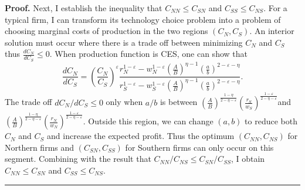 \documentclass[notitlepage,11pt]{article}%
\newenvironment{proof}[1][Proof]{\noindent \textbf{#1.} }{\  \rule{0.5em}{0.5em}}
\begin{document}
\begin{proof}
Next, I establish the inequality that $C_{NN}\leq C_{SN}$ and $C_{SS}\leq
C_{NS}$. For a typical firm, I can transform its technology choice problem
into a problem of choosing marginal costs of production in the two regions
$\left(  C_{N},C_{S}\right)  $. An interior solution must occur where there is
a trade off between minimizing $C_{N}$ and $C_{S}$ thus $\frac{dC_{N}}{dC_{S}%
}\leq0$. When production function is CES, one can show that
\[
\frac{dC_{N}}{dC_{S}}=\left(  \frac{C_{N}}{C_{S}}\right)  ^{\varepsilon}%
\frac{r_{N}^{1-\varepsilon}-w_{N}^{1-\varepsilon}\left(  \frac{A}{B}\right)
^{\eta-1}\left(  \frac{a}{b}\right)  ^{2-\varepsilon-\eta}}{r_{S}%
^{1-\varepsilon}-w_{S}^{1-\varepsilon}\left(  \frac{A}{B}\right)  ^{\eta
-1}\left(  \frac{a}{b}\right)  ^{2-\varepsilon-\eta}}.
\]
The trade off $dC_{N}/dC_{S}\leq0$ only when $a/b$ is between $\left(
\frac{A}{B}\right)  ^{\frac{1-\eta}{2-\eta-\varepsilon}}\left(  \frac{r_{S}%
}{w_{S}}\right)  ^{\frac{1-\varepsilon}{2-\eta-\varepsilon}}$and $\left(
\frac{A}{B}\right)  ^{\frac{1-\eta}{2-\eta-\varepsilon}}\left(  \frac{r_{N}%
}{w_{N}}\right)  ^{\frac{1-\varepsilon}{2-\eta-\varepsilon}}$. Outside this
region, we can change $\left(  a,b\right)  $ to reduce both $C_{N}$ and
$C_{S}$ and increase the expected profit. Thus the optimum $\left(
C_{NN},C_{NS}\right)  $ for Northern firms and $\left(  C_{SN},C_{SS}\right)
$ for Southern firms can only occur on this segment. Combining with the result
that $C_{NN}/C_{NS}\leq C_{SN}/C_{SS}$, I obtain $C_{NN}\leq C_{SN}$ and
$C_{SS}\leq C_{NS}$.
\end{proof}
\end{document}
